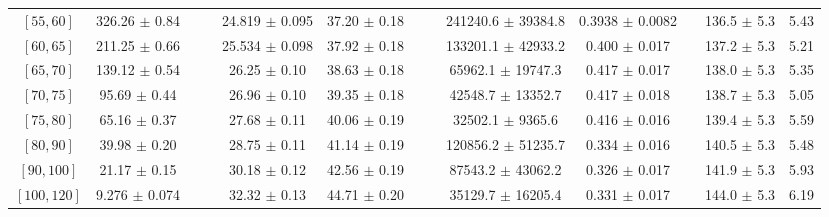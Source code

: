 \begin{tabular}{c||c|c|c|c|c|c|c|c|c|c|c||c}
$[55, 60]$ & 326.26 $\pm$ 0.84 &  &  & 24.819 $\pm$ 0.095 & 37.20 $\pm$ 0.18 &  &  & 241240.6 $\pm$ 39384.8 & 0.3938 $\pm$ 0.0082 &  & 136.5 $\pm$ 5.3 & 5.43\\
$[60, 65]$ & 211.25 $\pm$ 0.66 &  &  & 25.534 $\pm$ 0.098 & 37.92 $\pm$ 0.18 &  &  & 133201.1 $\pm$ 42933.2 & 0.400 $\pm$ 0.017 &  & 137.2 $\pm$ 5.3 & 5.21\\
$[65, 70]$ & 139.12 $\pm$ 0.54 &  &  & 26.25 $\pm$ 0.10 & 38.63 $\pm$ 0.18 &  &  & 65962.1 $\pm$ 19747.3 & 0.417 $\pm$ 0.017 &  & 138.0 $\pm$ 5.3 & 5.35\\
$[70, 75]$ & 95.69 $\pm$ 0.44 &  &  & 26.96 $\pm$ 0.10 & 39.35 $\pm$ 0.18 &  &  & 42548.7 $\pm$ 13352.7 & 0.417 $\pm$ 0.018 &  & 138.7 $\pm$ 5.3 & 5.05\\
$[75, 80]$ & 65.16 $\pm$ 0.37 &  &  & 27.68 $\pm$ 0.11 & 40.06 $\pm$ 0.19 &  &  & 32502.1 $\pm$ 9365.6 & 0.416 $\pm$ 0.016 &  & 139.4 $\pm$ 5.3 & 5.59\\
$[80, 90]$ & 39.98 $\pm$ 0.20 &  &  & 28.75 $\pm$ 0.11 & 41.14 $\pm$ 0.19 &  &  & 120856.2 $\pm$ 51235.7 & 0.334 $\pm$ 0.016 &  & 140.5 $\pm$ 5.3 & 5.48\\
$[90, 100]$ & 21.17 $\pm$ 0.15 &  &  & 30.18 $\pm$ 0.12 & 42.56 $\pm$ 0.19 &  &  & 87543.2 $\pm$ 43062.2 & 0.326 $\pm$ 0.017 &  & 141.9 $\pm$ 5.3 & 5.93\\
$[100, 120]$ & 9.276 $\pm$ 0.074 &  &  & 32.32 $\pm$ 0.13 & 44.71 $\pm$ 0.20 &  &  & 35129.7 $\pm$ 16205.4 & 0.331 $\pm$ 0.017 &  & 144.0 $\pm$ 5.3 & 6.19\\
\end{tabular}
